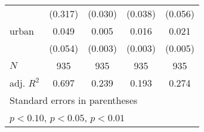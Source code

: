 {\begin{tabular}{l*{4}{c}}
            &     (0.317)         &     (0.030)         &     (0.038)         &     (0.056)         \\
[1em]
urban       &       0.049         &       0.005\sym{**} &       0.016\sym{***}&       0.021\sym{***}\\
            &     (0.054)         &     (0.003)         &     (0.003)         &     (0.005)         \\
\hline
\(N\)       &         935         &         935         &         935         &         935         \\
adj. \(R^{2}\)&       0.697         &       0.239         &       0.193         &       0.274         \\
\hline\hline
\multicolumn{5}{l}{\footnotesize Standard errors in parentheses}\\
\multicolumn{5}{l}{\footnotesize \sym{*} \(p<0.10\), \sym{**} \(p<0.05\), \sym{***} \(p<0.01\)}\\
\end{tabular}
}
